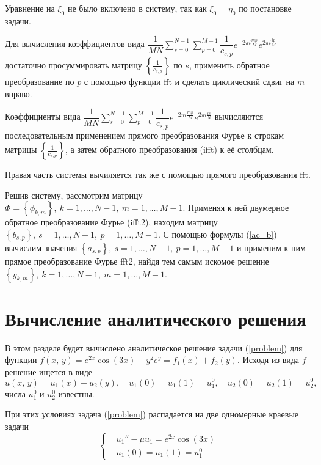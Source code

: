 \documentclass[11pt]{article}
\begin{document}
Уравнение на $\xi_0$ не было включено в систему, так как $\xi_0 = \eta_0$ по постановке задачи.

Для вычисления коэффициентов вида 
$\dfrac{1}{MN}\sum\limits_{s=0}^{N-1}\sum\limits_{p=0}^{M-1}\dfrac{1}{c_{s,p}}e^{-2\pi i\frac{mp}{M}}e^{2\pi i\frac{lp}{M}}$ достаточно
просуммировать матрицу $\left\{\frac{1}{c_{s,p}}\right\}$ по $s$, применить обратное преобразование по $p$ с помощью функции fft и 
сделать циклический сдвиг на $m$ вправо.

Коэффициенты вида 
$\dfrac{1}{MN}\sum\limits_{s=0}^{N-1}\sum\limits_{p=0}^{M-1}\dfrac{1}{c_{s,p}}e^{-2\pi i\frac{mp}{M}}e^{2\pi i\frac{ls}{N}}$ 
вычисляются последовательным применением прямого преобразования Фурье к строкам матрицы  $\left\{\frac{1}{c_{s,p}}\right\}$, а затем
обратного преобразования (ifft) к её столбцам.

Правая часть системы вычиляется так же с помощью прямого преобразования fft.

Решив систему, рассмотрим матрицу $\Phi = \left\{\phi_{k,m}\right\},\ k = 1,\ldots,N-1, \ m = 1,\ldots,M-1$.
Применяя к ней двумерное обратное преобразование Фурье (ifft2), находим матрицу
 $\left\{b_{s,p}\right\},\ s = 1,\ldots,N-1, \ p = 1,\ldots,M-1$.
С помощью формулы (\ref{ac=b}) вычислим значения $\left\{a_{s,p}\right\},\ s = 1,\ldots,N-1, \ p = 1,\ldots,M-1$ и применим к ним
прямое преобразование Фурье fft2, найдя тем самым искомое решение 
$\left\{y_{k,m}\right\},\ k = 1,\ldots,N-1, \ m = 1,\ldots,M-1$.

\newpage
\section{Вычисление аналитического решения}
В этом разделе будет вычислено аналитическое решение задачи (\ref{problem}) для функции 
$f\left(x, \, y\right) = e^{2x}\cos\left(3x\right)-y^2e^y = f_1(x) + f_2(y).$ Исходя из вида $f$ решение ищется в виде 
$$u(x, \, y) = u_1(x) + u_2(y), \quad u_1(0) = u_1(1) = u_1^0, \quad u_2(0) = u_2(1) = u_2^0,$$
числа $u_1^0$ и $u_2^0$ известны.

При этих условиях задача (\ref{problem}) распадается на две одномерные краевые задачи
\begin{equation}
\left\{
	\begin{aligned}
	& u_1''-\mu u_1 = e^{2x}\cos(3x) \label{bvp1} \\
	& u_1(0) = u_1(1) = u_1^0 
	\end{aligned}	
\right.
\end{equation}
\end{document}
